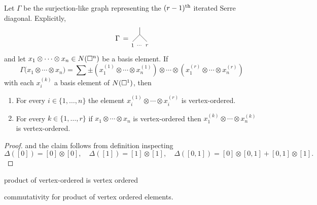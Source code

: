 \begin{lemma}
	Let $\Gamma$ be the surjection-like graph representing the $(r-1)^\mathrm{th}$ iterated Serre diagonal. Explicitly,
	\begin{equation*}
	\begin{tikzpicture}[scale=.35]
	\node at (9.5, 1){$\Gamma \, = $};
	\draw (11,.5)--(12,1.5)--(12,2.5);
	\draw (13,.5)--(12,1.5);
	\node at (11,0){$\scriptstyle 1$};
	\node at (12,0){$\scriptstyle \dots$};
	\node at (13,0){$\scriptstyle r$};
	\end{tikzpicture}
	\end{equation*}
	and let $x_1 \otimes \cdots \otimes x_n \in N(\square^n)$ be a basis element.
	If
	\begin{equation*}	
	\Gamma \big( x_1 \otimes \cdots \otimes x_n \big) =
	\sum \pm \left( x_1^{(1)} \otimes \cdots \otimes x_n^{(1)} \right)
	\otimes \cdots \otimes
	\left( x_1^{(r)} \otimes \cdots \otimes x_n^{(r)} \right)
	\end{equation*}
	with each $x_i^{(k)}$ a basis element of $N(\square^1)$, then
	\begin{enumerate}
		\item For every $i \in \{1, \dots, n\}$ the element $x_i^{(1)} \otimes \cdots \otimes x_i^{(r)}$ is vertex-ordered.
	
	 	\item For every $k \in \{1, \dots, r\}$ if $x_1 \otimes \cdots \otimes x_n$ is vertex-ordered then $x_1^{(k)} \otimes \cdots \otimes x_n^{(k)}$ is vertex-ordered.
	\end{enumerate}
\end{lemma}

\begin{proof}
	and the claim follows from definition inspecting
	\begin{equation*}
	\Delta([0]) = [0] \otimes [0], \quad \Delta([1]) = [1] \otimes [1], \quad \Delta([0, 1]) = [0] \otimes [0, 1] + [0, 1] \otimes [1].
	\end{equation*}
\end{proof}

\begin{lemma}
	product of vertex-ordered is vertex ordered
\end{lemma}

\begin{lemma}
	commutativity for product of vertex ordered elements.
\end{lemma}